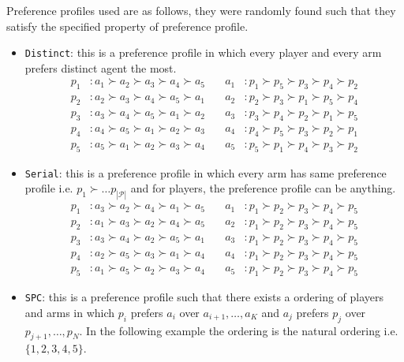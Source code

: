 \documentclass{article}
\begin{document}
Preference profiles used are as follows, they were randomly found such that they satisfy the specified property of preference profile.
\begin{itemize}[leftmargin=*, nosep,noitemsep, topsep=0pt]
    \item \texttt{Distinct}: this is a preference profile in which every player and every arm prefers distinct agent the most. 
    \begin{align*}
    p_1&: a_1 \succ a_2 \succ a_3 \succ a_4 \succ a_5 \quad & a_1&: p_1 \succ p_5 \succ p_3 \succ p_4 \succ p_2 \\
    p_2&: a_2 \succ a_3 \succ a_4 \succ a_5 \succ a_1 \quad & a_2&: p_2 \succ p_3 \succ p_1 \succ p_5 \succ p_4 \\
    p_3&: a_3 \succ a_4 \succ a_5 \succ a_1 \succ a_2 \quad & a_3&: p_3 \succ p_4 \succ p_2 \succ p_1 \succ p_5 \\
    p_4&: a_4 \succ a_5 \succ a_1 \succ a_2 \succ a_3 \quad & a_4&: p_4 \succ p_5 \succ p_3 \succ p_2 \succ p_1 \\
    p_5&: a_5 \succ a_1 \succ a_2 \succ a_3 \succ a_4 \quad & a_5&: p_5 \succ p_1 \succ p_4 \succ p_3 \succ p_2
\end{align*}
\item \texttt{Serial}: this is a preference profile in which every arm has same preference profile i.e. $p_1\succ \ldots p_{|\mathcal{P}|}$ and for players, the preference profile can be anything.
\begin{align*}
    p_1&: a_3 \succ a_2 \succ a_4 \succ a_1 \succ a_5 \quad & a_1&: p_1 \succ p_2 \succ p_3 \succ p_4 \succ p_5 \\
    p_2&: a_1 \succ a_3 \succ a_2 \succ a_4 \succ a_5 \quad & a_2&: p_1 \succ p_2 \succ p_3 \succ p_4 \succ p_5 \\
    p_3&: a_3 \succ a_4 \succ a_2 \succ a_5 \succ a_1 \quad & a_3&: p_1 \succ p_2 \succ p_3 \succ p_4 \succ p_5 \\
    p_4&: a_2 \succ a_5 \succ a_3 \succ a_1 \succ a_4 \quad & a_4&: p_1 \succ p_2 \succ p_3 \succ p_4 \succ p_5 \\
    p_5&: a_1 \succ a_5 \succ a_2 \succ a_3 \succ a_4 \quad & a_5&: p_1 \succ p_2 \succ p_3 \succ p_4 \succ p_5
\end{align*}
\item \texttt{SPC}: this is a preference profile such that there exists a ordering of players and arms in which $p_i$ prefers $a_i$ over $a_{i+1},\ldots,a_K$ and $a_j$ prefers $p_j$ over $p_{j+1},\ldots,p_N$. In the following example the ordering is the natural ordering i.e. $\{1,2,3,4,5\}$. 

\end{itemize}
\end{document}
